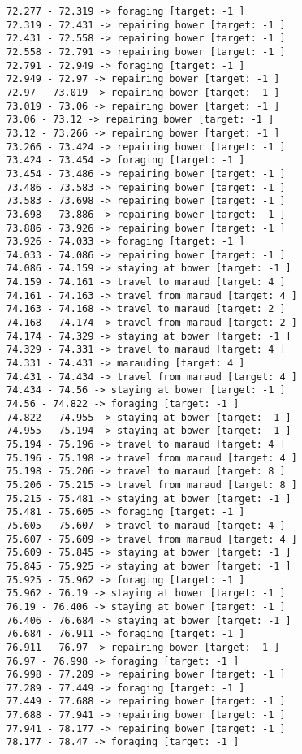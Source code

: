 \documentclass[11pt]{article}
\begin{document}
\begin{Verbatim}[commandchars=\\\{\}]
72.277 - 72.319 -> foraging [target: -1 ]
72.319 - 72.431 -> repairing bower [target: -1 ]
72.431 - 72.558 -> repairing bower [target: -1 ]
72.558 - 72.791 -> repairing bower [target: -1 ]
72.791 - 72.949 -> foraging [target: -1 ]
72.949 - 72.97 -> repairing bower [target: -1 ]
72.97 - 73.019 -> repairing bower [target: -1 ]
73.019 - 73.06 -> repairing bower [target: -1 ]
73.06 - 73.12 -> repairing bower [target: -1 ]
73.12 - 73.266 -> repairing bower [target: -1 ]
73.266 - 73.424 -> repairing bower [target: -1 ]
73.424 - 73.454 -> foraging [target: -1 ]
73.454 - 73.486 -> repairing bower [target: -1 ]
73.486 - 73.583 -> repairing bower [target: -1 ]
73.583 - 73.698 -> repairing bower [target: -1 ]
73.698 - 73.886 -> repairing bower [target: -1 ]
73.886 - 73.926 -> repairing bower [target: -1 ]
73.926 - 74.033 -> foraging [target: -1 ]
74.033 - 74.086 -> repairing bower [target: -1 ]
74.086 - 74.159 -> staying at bower [target: -1 ]
74.159 - 74.161 -> travel to maraud [target: 4 ]
74.161 - 74.163 -> travel from maraud [target: 4 ]
74.163 - 74.168 -> travel to maraud [target: 2 ]
74.168 - 74.174 -> travel from maraud [target: 2 ]
74.174 - 74.329 -> staying at bower [target: -1 ]
74.329 - 74.331 -> travel to maraud [target: 4 ]
74.331 - 74.431 -> marauding [target: 4 ]
74.431 - 74.434 -> travel from maraud [target: 4 ]
74.434 - 74.56 -> staying at bower [target: -1 ]
74.56 - 74.822 -> foraging [target: -1 ]
74.822 - 74.955 -> staying at bower [target: -1 ]
74.955 - 75.194 -> staying at bower [target: -1 ]
75.194 - 75.196 -> travel to maraud [target: 4 ]
75.196 - 75.198 -> travel from maraud [target: 4 ]
75.198 - 75.206 -> travel to maraud [target: 8 ]
75.206 - 75.215 -> travel from maraud [target: 8 ]
75.215 - 75.481 -> staying at bower [target: -1 ]
75.481 - 75.605 -> foraging [target: -1 ]
75.605 - 75.607 -> travel to maraud [target: 4 ]
75.607 - 75.609 -> travel from maraud [target: 4 ]
75.609 - 75.845 -> staying at bower [target: -1 ]
75.845 - 75.925 -> staying at bower [target: -1 ]
75.925 - 75.962 -> foraging [target: -1 ]
75.962 - 76.19 -> staying at bower [target: -1 ]
76.19 - 76.406 -> staying at bower [target: -1 ]
76.406 - 76.684 -> staying at bower [target: -1 ]
76.684 - 76.911 -> foraging [target: -1 ]
76.911 - 76.97 -> repairing bower [target: -1 ]
76.97 - 76.998 -> foraging [target: -1 ]
76.998 - 77.289 -> repairing bower [target: -1 ]
77.289 - 77.449 -> foraging [target: -1 ]
77.449 - 77.688 -> repairing bower [target: -1 ]
77.688 - 77.941 -> repairing bower [target: -1 ]
77.941 - 78.177 -> repairing bower [target: -1 ]
78.177 - 78.47 -> foraging [target: -1 ]

\end{Verbatim}
\end{document}
